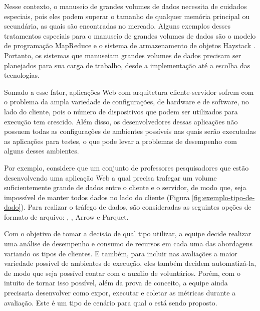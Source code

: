 \documentclass[12pt]{tcc}
\begin{document}
	Nesse contexto, o manuseio de grandes volumes de dados necessita de cuidados especiais, pois eles podem superar o tamanho de qualquer memória principal ou secundária, as quais são encontradas no mercado. Alguns exemplos desses tratamentos especiais para o manuseio de grandes volumes de dados são o modelo de programação MapReduce \citep{Dean2008MapReduce} e o sistema de armazenamento de objetos Haystack \citep{Beaver2010Finding}. Portanto, os sistemas que manuseiam grandes volumes de dados precisam ser planejados para sua carga de trabalho, desde a implementação até a escolha das tecnologias.

	Somado a esse fator, aplicações Web com arquitetura cliente-servidor sofrem com o problema da ampla variedade de configurações, de hardware e de software, no lado do cliente, pois o número de dispositivos que podem ser utilizados para execução tem crescido. Além disso, os desenvolvedores dessas aplicações não possuem todas as configurações de ambientes possíveis nas quais serão executadas as aplicações para testes, o que pode levar a problemas de desempenho com alguns desses ambientes. 

	Por exemplo, considere que um conjunto de professores pesquisadores que estão desenvolvendo uma aplicação Web a qual precisa trafegar um volume suficientemente grande de dados entre o cliente e o servidor, de modo que, seja impossível de manter todos dados no lado do cliente (Figura \ref{fig:exemplo-tipo-de-dado}). Para realizar o tráfego de dados, são consideradas as seguintes opções de formato de arquivo: , , Arrow e Parquet. 

	Com o objetivo de tomar a decisão de qual tipo utilizar, a equipe decide realizar uma análise de desempenho e consumo de recursos em cada uma das abordagens variando os tipos de clientes. E também, para incluir nas avaliações a maior variedade possível de ambientes de execução, eles também decidem automatizá-la, de modo que seja possível contar com o auxílio de voluntários. Porém, com o intuito de tornar isso possível, além da prova de conceito, a equipe ainda precisaria desenvolver como expor, executar e coletar as métricas durante a avaliação. Este é um tipo de cenário para qual o  está sendo proposto. 
\end{document}
